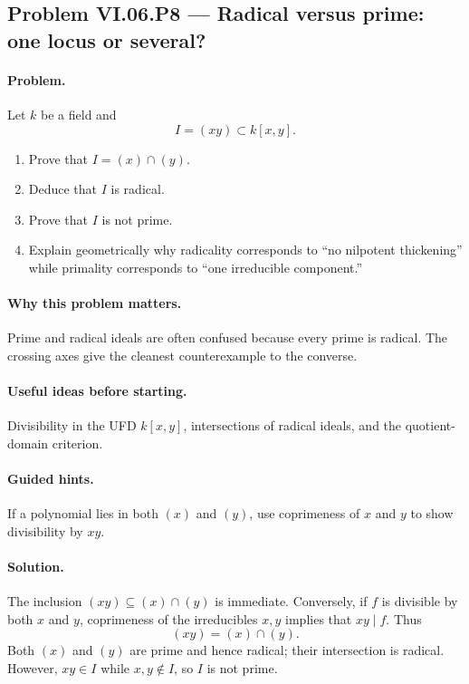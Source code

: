 \subsection*{Problem VI.06.P8 --- Radical versus prime: one locus or several?}
\label{prob:vi-06-p8}

\paragraph{Problem.}
Let \(k\) be a field and
\[
I=(xy)\subset k[x,y].
\]
\begin{enumerate}
\item Prove that \(I=(x)\cap(y)\).
\item Deduce that \(I\) is radical.
\item Prove that \(I\) is not prime.
\item Explain geometrically why radicality corresponds to ``no nilpotent thickening'' while
primality corresponds to ``one irreducible component.''
\end{enumerate}

\ifdefined\FullProblemDossiers
\paragraph{Why this problem matters.}
Prime and radical ideals are often confused because every prime is radical.  The crossing
axes give the cleanest counterexample to the converse.

\paragraph{Useful ideas before starting.}
Divisibility in the UFD \(k[x,y]\), intersections of radical ideals, and the quotient-domain
criterion.

\paragraph{Guided hints.}
If a polynomial lies in both \((x)\) and \((y)\), use coprimeness of \(x\) and \(y\) to
show divisibility by \(xy\).

\paragraph{Solution.}
The inclusion \((xy)\subseteq(x)\cap(y)\) is immediate.  Conversely, if \(f\) is divisible
by both \(x\) and \(y\), coprimeness of the irreducibles \(x,y\) implies that \(xy\mid f\).
Thus
\[
(xy)=(x)\cap(y).
\]
Both \((x)\) and \((y)\) are prime and hence radical; their intersection is radical.
However, \(xy\in I\) while \(x,y\notin I\), so \(I\) is not prime.

